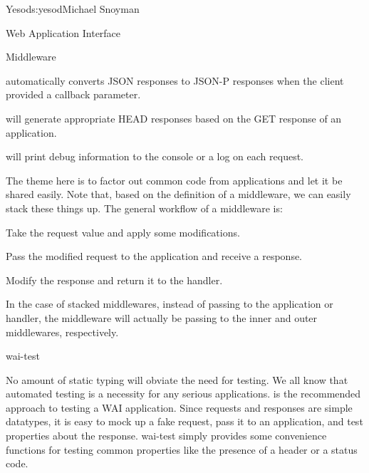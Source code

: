 \begin{aosachapter}{Yesod}{s:yesod}{Michael Snoyman}
\begin{aosasect1}{Web Application Interface}
\begin{aosasect2}{Middleware}
\begin{aosaitemize}
\item {} automatically converts JSON responses to JSON-P
  responses when the client provided a callback parameter.

\item {} will generate appropriate HEAD responses based
  on the GET response of an application.

\item {} will print debug information to the console or a
  log on each request.

\end{aosaitemize}

The theme here is to factor out common code from applications and let
it be shared easily. Note that, based on the definition of a
middleware, we can easily stack these things up. The general workflow
of a middleware is:

\begin{aosaenumerate}

\item Take the request value and apply some modifications.

\item Pass the modified request to the application and receive a
  response.

\item Modify the response and return it to the handler.

\end{aosaenumerate}

In the case of stacked middlewares, instead of passing to the
application or handler, the middleware will actually be passing to the
inner and outer middlewares, respectively.

\end{aosasect2}

\begin{aosasect2}{wai-test}

No amount of static typing will obviate the need for testing. We all
know that automated testing is a necessity for any serious
applications.  is the recommended approach to testing a
WAI application. Since requests and responses are simple datatypes, it
is easy to mock up a fake request, pass it to an application, and test
properties about the response. wai-test simply provides some
convenience functions for testing common properties like the presence
of a header or a status code.

\end{aosasect2}


\end{aosasect1}
\end{aosachapter}
